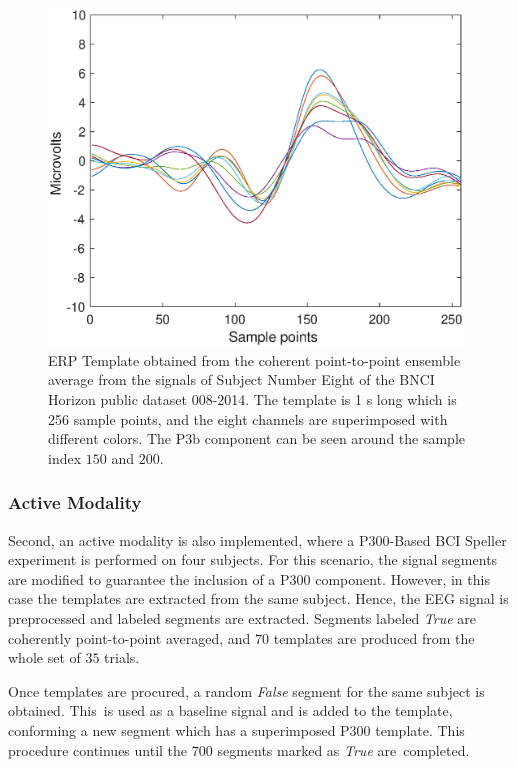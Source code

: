 \documentclass[brainsci,article,accept,moreauthors,pdftex,10pt,a4paper]{mdpi}
\begin{document}
\begin{figure}[H]
\centering
\includegraphics[width=11cm]{images/erptemplate1.eps}
\caption{ERP Template obtained from the coherent point-to-point ensemble average from the signals of Subject Number Eight of the BNCI Horizon public dataset 008-2014. The template is 1 s long which is 256 sample points, and the eight channels are superimposed with different colors.  The P3b component can be seen around the sample index $150$ and $200$.}
\label{fig:erptemplate1}
\end{figure}


\subsubsection{Active Modality}

Second, an active modality is also implemented, where a P300-Based BCI Speller experiment is performed on four subjects. For this scenario, the signal segments are modified to guarantee the inclusion of a P300 component. However, in this case the templates are extracted from the same subject.  Hence, the EEG signal is preprocessed and labeled segments are extracted.  Segments labeled \textit{True} are coherently point-to-point averaged, and $70$ templates are produced from the whole set of $35$ trials.  

Once templates are procured, a random \textit{False} segment for the same subject is obtained.  This~is used as a baseline signal and is added to the template, conforming a new segment which has a superimposed P300 template.  This procedure continues until the $700$ segments marked as \textit{True} are~completed.  

\end{document}
